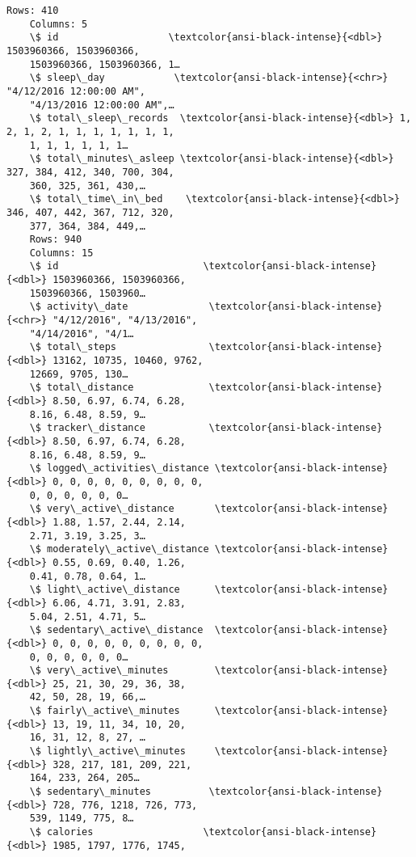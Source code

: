 \begin{Verbatim}[commandchars=\\\{\}]
    Rows: 410
    Columns: 5
    \$ id                   \textcolor{ansi-black-intense}{<dbl>} 1503960366, 1503960366,
    1503960366, 1503960366, 1…
    \$ sleep\_day            \textcolor{ansi-black-intense}{<chr>} "4/12/2016 12:00:00 AM",
    "4/13/2016 12:00:00 AM",…
    \$ total\_sleep\_records  \textcolor{ansi-black-intense}{<dbl>} 1, 2, 1, 2, 1, 1, 1, 1, 1, 1, 1,
    1, 1, 1, 1, 1, 1…
    \$ total\_minutes\_asleep \textcolor{ansi-black-intense}{<dbl>} 327, 384, 412, 340, 700, 304,
    360, 325, 361, 430,…
    \$ total\_time\_in\_bed    \textcolor{ansi-black-intense}{<dbl>} 346, 407, 442, 367, 712, 320,
    377, 364, 384, 449,…
    Rows: 940
    Columns: 15
    \$ id                         \textcolor{ansi-black-intense}{<dbl>} 1503960366, 1503960366,
    1503960366, 1503960…
    \$ activity\_date              \textcolor{ansi-black-intense}{<chr>} "4/12/2016", "4/13/2016",
    "4/14/2016", "4/1…
    \$ total\_steps                \textcolor{ansi-black-intense}{<dbl>} 13162, 10735, 10460, 9762,
    12669, 9705, 130…
    \$ total\_distance             \textcolor{ansi-black-intense}{<dbl>} 8.50, 6.97, 6.74, 6.28,
    8.16, 6.48, 8.59, 9…
    \$ tracker\_distance           \textcolor{ansi-black-intense}{<dbl>} 8.50, 6.97, 6.74, 6.28,
    8.16, 6.48, 8.59, 9…
    \$ logged\_activities\_distance \textcolor{ansi-black-intense}{<dbl>} 0, 0, 0, 0, 0, 0, 0, 0, 0,
    0, 0, 0, 0, 0, 0…
    \$ very\_active\_distance       \textcolor{ansi-black-intense}{<dbl>} 1.88, 1.57, 2.44, 2.14,
    2.71, 3.19, 3.25, 3…
    \$ moderately\_active\_distance \textcolor{ansi-black-intense}{<dbl>} 0.55, 0.69, 0.40, 1.26,
    0.41, 0.78, 0.64, 1…
    \$ light\_active\_distance      \textcolor{ansi-black-intense}{<dbl>} 6.06, 4.71, 3.91, 2.83,
    5.04, 2.51, 4.71, 5…
    \$ sedentary\_active\_distance  \textcolor{ansi-black-intense}{<dbl>} 0, 0, 0, 0, 0, 0, 0, 0, 0,
    0, 0, 0, 0, 0, 0…
    \$ very\_active\_minutes        \textcolor{ansi-black-intense}{<dbl>} 25, 21, 30, 29, 36, 38,
    42, 50, 28, 19, 66,…
    \$ fairly\_active\_minutes      \textcolor{ansi-black-intense}{<dbl>} 13, 19, 11, 34, 10, 20,
    16, 31, 12, 8, 27, …
    \$ lightly\_active\_minutes     \textcolor{ansi-black-intense}{<dbl>} 328, 217, 181, 209, 221,
    164, 233, 264, 205…
    \$ sedentary\_minutes          \textcolor{ansi-black-intense}{<dbl>} 728, 776, 1218, 726, 773,
    539, 1149, 775, 8…
    \$ calories                   \textcolor{ansi-black-intense}{<dbl>} 1985, 1797, 1776, 1745,

\end{Verbatim}
